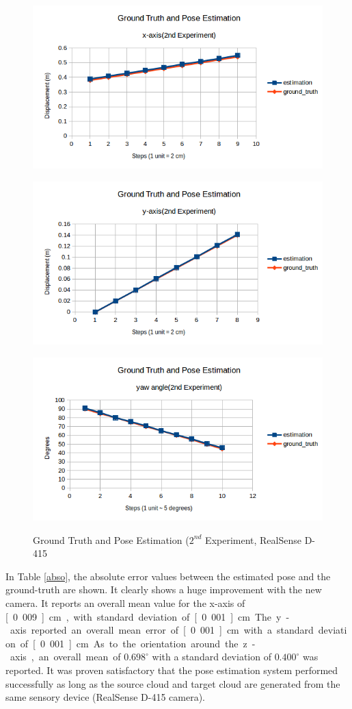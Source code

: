 \begin{figure}[htp]
\begin{center}
{
  \includegraphics[clip,width=0.7\columnwidth]{figures/x_newrealsense.png}
}
\end{center}
\begin{center}
{
  \includegraphics[clip,width=0.7\columnwidth]{figures/y_newrealsense.png}
}
\end{center}

\begin{center}
{
  \includegraphics[clip,width=0.7\columnwidth]{figures/yaw_newrealsense.png}
}
\end{center}
\caption{Ground Truth and Pose Estimation ($2^{nd}$ Experiment, RealSense D-415}
\label{newreal22}
\end{figure}

In Table \ref{abso}, the absolute error values between the estimated pose and the ground-truth are shown. It clearly shows a huge improvement with the new camera. It reports an overall mean value for the x-axis of \unit[0.009] {cm},  with standard deviation of \unit[0.001] {cm}. The y-axis reported an overall mean error of \unit[0.001] {cm} with a standard deviation of \unit[0.001] {cm}. As to the orientation around the z-axis, an overall mean of $0.698^{\circ}$ with a standard deviation of $0.400^{\circ}$ was reported. It was proven satisfactory that the pose estimation system performed successfully as long as the source cloud and target cloud are generated from the same sensory device (RealSense D-415 camera). 

